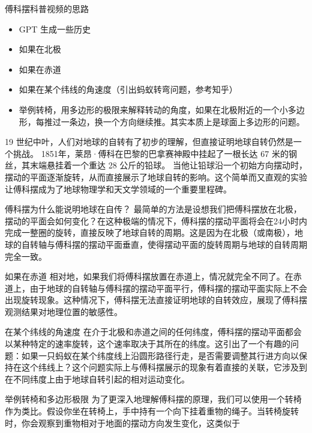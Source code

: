 
\begin{issues}
\issueDraft
\end{issues}

傅科摆科普视频的思路
\begin{itemize}
\item GPT 生成一些历史
\item 如果在北极
\item 如果在赤道
\item 如果在某个纬线的角速度（引出蚂蚁转弯问题，参考知乎）
\item 举例转椅，用多边形的极限来解释转动的角度，如果在北极附近的一个小多边形，每推过一条边，换一个方向继续推。其实本质上是球面上多边形的问题。
\end{itemize}

19 世纪中叶，人们对地球的自转有了初步的理解，但直接证明地球自转仍然是一个挑战。 1851年，莱昂·傅科在巴黎的巴拿赛神殿中挂起了一根长达 67 米的钢丝，其末端悬挂着一个重达 28 公斤的铅球。 当他让铅球沿一个初始方向摆动时，摆动的平面逐渐旋转，从而直接展示了地球自转的影响。这个简单而又直观的实验让傅科摆成为了地球物理学和天文学领域的一个重要里程碑。

傅科摆为什么能说明地球在自传？ 最简单的方法是设想我们把傅科摆放在北极， 摆动的平面会如何变化？在这种极端的情况下，傅科摆的摆动平面将会在24小时内完成一整圈的旋转，直接反映了地球自转的周期。这是因为在北极（或南极），地球的自转轴与傅科摆的摆动平面垂直，使得摆动平面的旋转周期与地球的自转周期完全一致。

如果在赤道
相对地，如果我们将傅科摆放置在赤道上，情况就完全不同了。在赤道上，由于地球的自转轴与傅科摆的摆动平面平行，傅科摆的摆动平面实际上不会出现旋转现象。这种情况下，傅科摆无法直接证明地球的自转效应，展现了傅科摆观测结果对地理位置的敏感性。

在某个纬线的角速度
在介于北极和赤道之间的任何纬度，傅科摆的摆动平面都会以某种特定的速率旋转，这个速率取决于其所在的纬度。这引出了一个有趣的问题：如果一只蚂蚁在某个纬度线上沿圆形路径行走，是否需要调整其行进方向以保持在这个纬线上？这个问题实际上与傅科摆展示的现象有着直接的关联，它涉及到在不同纬度上由于地球自转引起的相对运动变化。

举例转椅和多边形极限
为了更深入地理解傅科摆的原理，我们可以使用一个转椅作为类比。假设你坐在转椅上，手中持有一个向下挂着重物的绳子。当转椅旋转时，你会观察到重物相对于地面的摆动方向发生变化，这类似于
